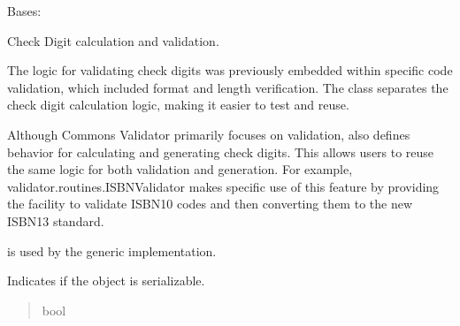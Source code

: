 \documentclass[letterpaper,10pt,english]{sphinxmanual}
\begin{document}
\begin{fulllineitems}
\label{\detokenize{apache_commons_validator_python.routines.checkdigit:apache_commons_validator_python.routines.checkdigit.checkdigit.CheckDigit}}
\pysigstartsignatures
{}
\pysigstopsignatures
\sphinxAtStartPar
Bases: 

\sphinxAtStartPar
Check Digit calculation and validation.

\sphinxAtStartPar
The logic for validating check digits was previously embedded within specific
code validation, which included format and length verification. The 
class separates the check digit calculation logic, making it easier to test and reuse.

\sphinxAtStartPar
Although Commons Validator primarily focuses on validation,  also defines
behavior for calculating and generating check digits. This allows users to reuse the same
logic for both validation and generation. For example, validator.routines.ISBNValidator
makes specific use of this feature by providing the facility to validate
ISBN\sphinxhyphen{}10 codes and then converting them to the new ISBN\sphinxhyphen{}13 standard.

\sphinxAtStartPar
{} is used by the generic  implementation.

\begin{fulllineitems}
\label{\detokenize{apache_commons_validator_python.routines.checkdigit:apache_commons_validator_python.routines.checkdigit.checkdigit.CheckDigit.serializable}}
\pysigstartsignatures
{}
\pysigstopsignatures
\sphinxAtStartPar
Indicates if the object is serializable.
\begin{quote}\begin{description}
\sphinxAtStartPar
bool

\end{description}\end{quote}


\end{fulllineitems}
\end{fulllineitems}
\end{document}
